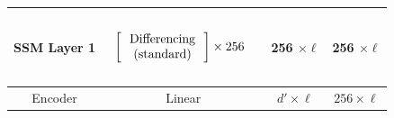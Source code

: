 \begin{table}[]
\begin{tabular}{@{}c|c|c|c@{}}
SSM Layer 1 & \begin{math}\begin{aligned}    \begin{matrix}    \text{\phantom{-}} \\    \end{matrix}    \\    &    \begin{bmatrix}    \text{\phantom{-} Differencing \phantom{-}} \\ \text{(standard)} \\    \end{bmatrix}    \times 256     \\     \begin{matrix}    \text{\phantom{-}} \\    \end{matrix}    \\\end{aligned}\end{math} & 256 $\times \ell$ & 256 $\times \ell$ \\ \midrule
Encoder     & Linear & $d' \times \ell$  & $256 \times \ell$ \\ \bottomrule
\end{tabular}
\end{table}

